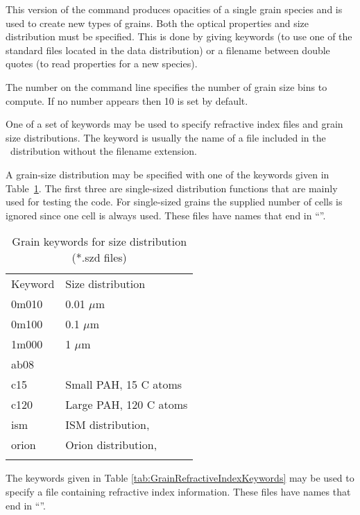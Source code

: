 This version of the command produces opacities of a single grain species
and is used to create new types of grains.
Both the optical properties
and size distribution must be specified.
This is done by giving keywords
(to use one of the standard files located in the data distribution)
or a filename between double quotes (to read properties for a new species).

The number on the command line specifies the number of
grain size bins to compute.
If no number appears then 10 is set by default.

One of a set of keywords may be used to
specify refractive index files and grain size distributions.
The keyword is usually the
name of a file included in the \Cloudy\ distribution
without the filename extension.

A grain-size
distribution may be specified with one of the keywords given in
Table~\ref{tab:GrainSizeDistributionKeywords}.
The first three are single-sized distribution functions that are mainly
used for testing the code.
For single-sized grains the supplied number
of cells is ignored since one cell is always used.
These files have names
that end in ``''.

\begin{table}
\centering
\caption{Grain keywords for size distribution (*.szd files)}
\begin{tabular}{ll}
\hline
Keyword& Size distribution\\
0m010& 0.01 $\mu$m\\
0m100& 0.1 $\mu$m\\
1m000& 1 $\mu$m\\
ab08& \citealp{Abel2008}\\
c15& Small PAH, 15 C atoms\\
c120& Large PAH, 120 C atoms\\
ism& ISM distribution, \citealp{Mathis1977}\\
orion& Orion distribution, \citealp{Baldwin1991}\\
\hline
\label{tab:GrainSizeDistributionKeywords}
\end{tabular}
\end{table}

The keywords given in Table \ref{tab:GrainRefractiveIndexKeywords}
may be used to specify a file containing
refractive index information.
These files have names that end in
``''.

